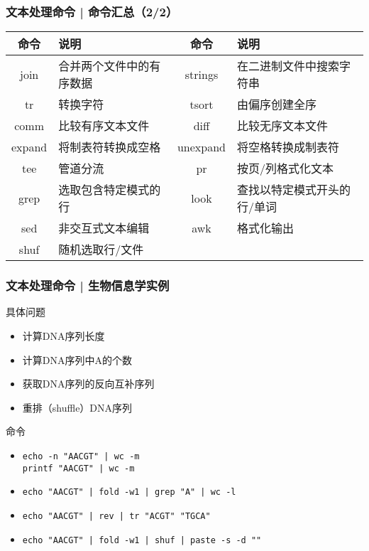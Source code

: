 \begin{frame}
  \frametitle{文本处理命令 | 命令汇总（2/2）}
  \begin{table}
    \centering
    \begin{tabularx}{\textwidth}{cX|cX}
      \hline
      \rowcolor{blue!50}命令 & 说明 & 命令 & 说明\\
      \hline
      join & 合并两个文件中的有序数据 & strings & 在二进制文件中搜索字符串\\
      tr & 转换字符 & tsort & 由偏序创建全序\\
      comm & 比较有序文本文件 & diff & 比较无序文本文件\\
      expand & 将制表符转换成空格 & unexpand & 将空格转换成制表符\\
      tee & 管道分流 & pr & 按页/列格式化文本\\
      grep & 选取包含特定模式的行 & look & 查找以特定模式开头的行/单词\\
      sed & 非交互式文本编辑 & awk & 格式化输出\\
      shuf & 随机选取行/文件 & & \\
      \hline
    \end{tabularx}
  \end{table}
\end{frame}

\begin{frame}[fragile]
  \frametitle{文本处理命令 | \alert{生物信息学实例}}
  \begin{block}{具体问题}
    \begin{itemize}
      \item<2-> 计算DNA序列长度
      \item<4-> 计算DNA序列中A的个数
      \item<6-> 获取DNA序列的反向互补序列
      \item<8-> 重排（shuffle）DNA序列
    \end{itemize}
  \end{block}
  \begin{block}{命令}
    \begin{itemize}
      \item<3-> \verb=echo -n "AACGT" | wc -m= \\ \verb=printf "AACGT" | wc -m=
      \item<5-> \verb=echo "AACGT" | fold -w1 | grep "A" | wc -l=
      \item<7-> \verb=echo "AACGT" | rev | tr "ACGT" "TGCA"=
      \item<9-> \verb=echo "AACGT" | fold -w1 | shuf | paste -s -d ""=
    \end{itemize}
  \end{block}
\end{frame}

